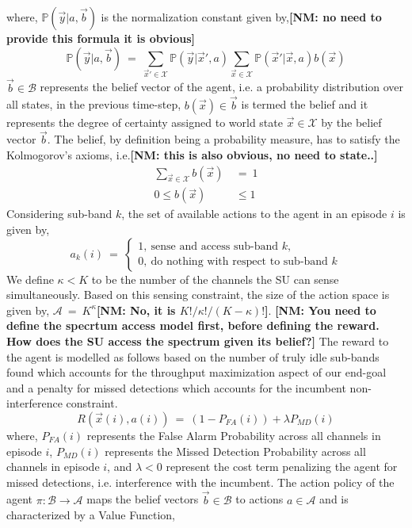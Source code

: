 \documentclass[10pt,twocolumn]{IEEEtran}
\newcommand{\nm}[1]{{\color{blue}\bf{[NM: #1]}}}
\begin{document}
where, $\mathbb{P}(\vec{y}|a,\vec{b})$ is the normalization constant given by,\nm{no need to provide this formula it is obvious}
\begin{equation}\label{9}
        \mathbb{P}(\vec{y}|a,\vec{b})\ =\ \sum_{\vec{x}' \in \mathcal{X}}\mathbb{P}(\vec{y}|\vec{x}',a)\sum_{\vec{x} \in \mathcal{X}}\mathbb{P}(\vec{x}'|\vec{x},a)b(\vec{x})
\end{equation}
$\vec{b} \in \mathcal{B}$ represents the belief vector of the agent, i.e. a probability distribution over all states, in the previous time-step,
$b(\vec{x}) \in \vec{b}$ is termed the belief and it represents the degree of certainty assigned to world state $\vec{x} \in \mathcal{X}$ by the belief vector $\vec{b}$. The belief, by definition being a probability measure, has to satisfy the Kolmogorov's axioms, i.e.\nm{this is also obvious, no need to state..}
\begin{equation}\label{10}
    \begin{aligned}
        \sum_{\vec{x} \in \mathcal{X}} b(\vec{x})\ &=\ 1 \\
        0 \leq b(\vec{x}) &\leq 1
    \end{aligned}
\end{equation}
Considering sub-band $k$, the set of available actions to the agent in an episode $i$ is given by,
\begin{equation}\label{11}
    a_k(i)\ =\ 
    \begin{cases}
        1,\ \text{sense and access sub-band $k$},\\
        0,\ \text{do nothing with respect to sub-band $k$}
    \end{cases}
\end{equation}
We define $\kappa < K$ to be the number of the channels the SU can sense simultaneously. Based on this sensing constraint, the size of the action space is given by, $\mathcal{A}\ =\ K^{\kappa}$\nm{No, it is $K!/\kappa!/(K-\kappa)!$}. 
\nm{You need to define the specrtum access model first, before defining the reward. How does the SU access the spectrum given its belief?}
The reward to the agent is modelled as follows based on the number of truly idle sub-bands found which accounts for the throughput maximization aspect of our end-goal and a penalty for missed detections which accounts for the incumbent non-interference constraint.
\begin{equation}\label{12}
    R(\vec{x}(i),a(i))\ =\ (1 - P_{FA}(i)) + \lambda P_{MD}(i)
\end{equation}
where, $P_{FA}(i)$ represents the False Alarm Probability across all channels in episode $i$, $P_{MD}(i)$ represents the Missed Detection Probability across all channels in episode $i$, and $\lambda < 0$ represent the cost term penalizing the agent for missed detections, i.e. interference with the incumbent. The action policy of the agent $\pi: \mathcal{B} \rightarrow \mathcal{A}$ maps the belief vectors $\vec{b} \in \mathcal{B}$ to actions $a \in \mathcal{A}$ and is characterized by a Value Function,
\end{document}
